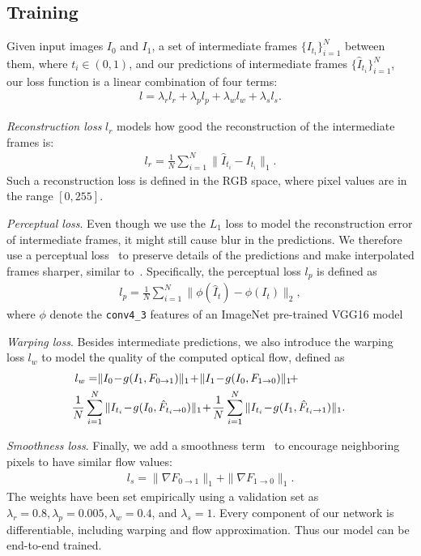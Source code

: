 \documentclass[10pt,twocolumn,letterpaper]{article}
\begin{document}
\subsection{Training}
\label{subsec:training}
Given input images $I_0$ and $I_1$, a set of intermediate frames $\{I_{t_i}\}_{i=1}^N$ between them, where $t_i\in(0, 1)$, and our predictions of intermediate frames $\{\hat{I}_{t_i}\}_{i=1}^N$, our loss function is a linear combination of four terms:
\begin{align}
l = \lambda_r l_r + \lambda_p l_p + \lambda_w l_w + \lambda_s l_s.
\end{align}

\textit{Reconstruction loss} $l_r$ models how good the reconstruction of the intermediate frames is:
\begin{align}
l_r = \frac{1}{N}\sum_{i=1}^N\|\hat{I}_{t_i} - I_{t_i}\|_1.
\end{align}
Such a reconstruction loss is defined in the RGB space, where pixel values are in the range $[0, 255]$.

\textit{Perceptual loss}. Even though we use the $L_1$ loss to model the reconstruction error of intermediate frames, it might still cause blur in the predictions. We therefore use a perceptual loss~\cite{johnson16perceptual} to preserve details of the predictions and make interpolated frames sharper, similar to~\cite{niklaus17video_iccv}. Specifically, the perceptual loss $l_p$ is defined as
\begin{align}
l_p = \frac{1}{N}\sum_{i=1}^N\|\phi(\hat{I}_t) - \phi(I_t)\|_2,
\end{align}
where $\phi$ denote the \texttt{conv4\_3} features of an ImageNet pre-trained VGG16 model~\cite{simonyan14very}

\textit{Warping loss}. Besides intermediate predictions, 
we also introduce the warping loss $l_w$ to model the quality of the computed optical flow, defined as
\begin{align}
l_w = &\|I_0\!-\!g(I_1, F_{0\rightarrow1})\|_1 \!+\! \|I_1\!-\!g(I_0, F_{1\rightarrow0})\|_1 \!+\! \\
	  & \hspace{-8mm} \frac{1}{N}\sum_{i=1}^N\|I_{t_i}\!-\!g(I_0, \hat{F}_{t_i\rightarrow 0})\|_1\!+\!\frac{1}{N}\sum_{i=1}^N\|I_{t_i}\!-\!g(I_1, \hat{F}_{t_i\rightarrow 1})\|_1.\notag
\end{align}

\textit{Smoothness loss}. Finally, we add a smoothness term~\cite{liu17video} to encourage neighboring pixels to have similar flow values:
\begin{align}
l_s = \|\nabla F_{0\rightarrow1}\|_1 + \|\nabla F_{1\rightarrow0}\|_1.
\end{align}
The weights have been set empirically using a validation set as $\lambda_r\!=\!0.8, \lambda_p\!=\!0.005, \lambda_w\!=\!0.4$, and $\lambda_s\!=\!1$. 
Every component of our network is differentiable, including warping and flow approximation. Thus our model can be end-to-end trained. 
\end{document}
